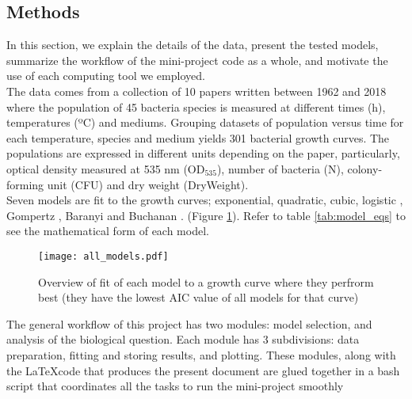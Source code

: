 \documentclass[titlepage,11pt]{article}
\begin{document}
\begin{linenumbers}
	\section{Methods}\label{methods}
	
	 In this section, we explain the details of the data, present the tested models, summarize the workflow of the mini-project code as a whole, and motivate the use of each computing tool we employed.\\
	
	The data comes from a collection of 10 papers written between 1962 and 2018 where the population of 45 bacteria species is measured at different times (h), temperatures (ºC) and mediums. Grouping datasets of population versus time for each temperature, species and medium yields 301 bacterial growth curves. The populations are expressed in different units depending on the paper, particularly,  optical density measured at 535 nm (OD$_{535} $), number of bacteria (N), colony-forming unit (CFU) and dry weight (DryWeight).\\
	Seven models are fit to the growth curves; exponential, quadratic, cubic, logistic \cite{Pearl1920, Verhulst1838}, Gompertz \cite{Zwietering1990}, Baranyi \cite{Baranyi1994} and Buchanan \cite{Buchanan1997}. (Figure \ref{all_models}). Refer to table \ref{tab:model_eqs} to see the mathematical form of each model.\\
	
	\begin{figure}[h]
		\texttt{[image: all\_models.pdf]}
		\centering
		\caption{Overview of fit of each model to a growth curve where they perfrorm best (they have the lowest AIC value of all models for that curve)}
		\label{all_models}
	\end{figure}
	
	The general workflow of this project has two modules: model selection, and analysis of the biological question.  Each module has 3 subdivisions: data preparation, fitting and storing results, and plotting. These modules, along with the \LaTeX code that produces the present document are glued together in a bash script that coordinates all the tasks to run the mini-project smoothly

\end{linenumbers}
\end{document}

